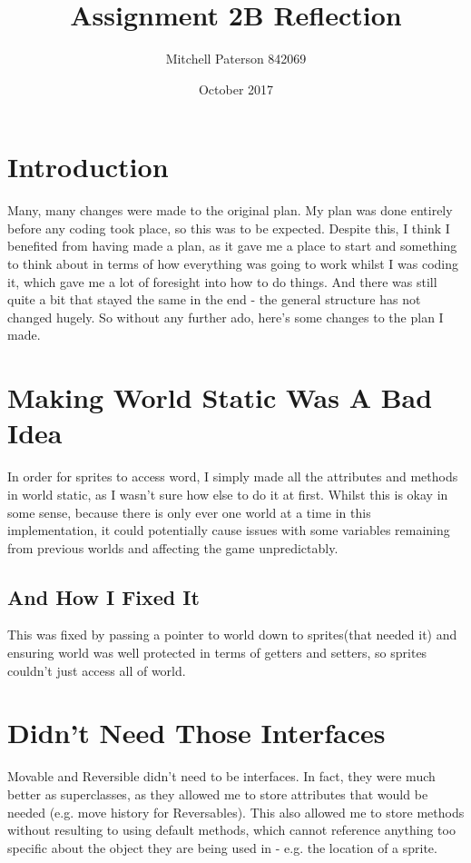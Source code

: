\documentclass{article}
\title{Assignment 2B Reflection}
\author{Mitchell Paterson 842069 }
\date{October 2017}
\begin{document}
\maketitle

\section{Introduction}
Many, many changes were made to the original plan. My plan was done entirely before any coding took place, so this was to be expected. Despite this, I think I benefited from having made a plan, as it gave me a place to start and something to think about in terms of how everything was going to work whilst I was coding it, which gave me a lot of foresight into how to do things. And there was still quite a bit that stayed the same in the end - the general structure has not changed hugely. So without any further ado, here's some changes to the plan I made.

\section{Making World Static Was A Bad Idea}
In order for sprites to access word, I simply made all the attributes and methods in world static, as I wasn't sure how else to do it at first. Whilst this is okay in some sense, because there is only ever one world at a time in this implementation, it could potentially cause issues with some variables remaining from previous worlds and affecting the game unpredictably. 
\subsection{And How I Fixed It}This was fixed by passing a pointer to world down to sprites(that needed it) and ensuring world was well protected in terms of getters and setters, so sprites couldn't just access all of world.

\section{Didn't Need Those Interfaces}
Movable and Reversible didn't need to be interfaces. In fact, they were much better as superclasses, as they allowed me to store attributes that would be needed (e.g. move history for Reversables). This also allowed me to store methods without resulting to using default methods, which cannot reference anything too specific about the object they are being used in - e.g. the location of a sprite.
\end{document}

